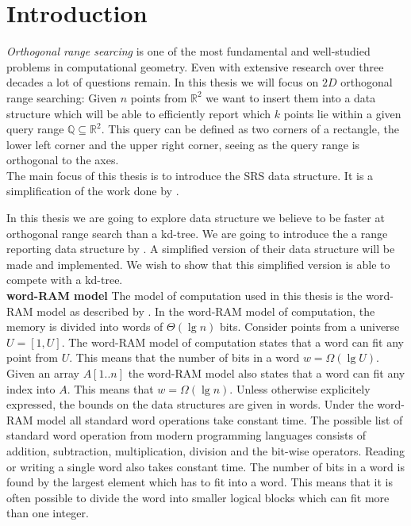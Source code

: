 \chapter{Introduction}
\label{ch:intro}

\emph{Orthogonal range searcing} is one of the most fundamental and well-studied problems in computational geometry. Even with extensive research over three decades a lot of questions remain. In this thesis we will focus on $2D$ orthogonal range searching: Given $n$ points from $\mathbb{R}^2$ we want to insert them into a data structure which will be able to efficiently report which $k$ points lie within a given query range $\mathbb{Q} \subseteq \mathbb{R}^2$. This query can be defined as two corners of a rectangle, the lower left corner and the upper right corner, seeing as the query range is orthogonal to the axes. \\

The main focus of this thesis is to introduce the SRS  data structure. It is a simplification of the work done by \citet{chanetal}.

In this thesis we are going to explore data structure we believe to be faster at orthogonal range search than a kd-tree. We are going to introduce the a range reporting data structure by \citet{chanetal}. A simplified version of their data structure will be made and implemented. We wish to show that this simplified version is able to compete with a kd-tree. \\



\noindent \textbf{word-RAM model} The model of computation used in this thesis is the word-RAM model as described by . In the word-RAM model of computation, the memory is divided into words of $\Theta(\lg n)$ bits. Consider points from a universe $U = [1,U]$. The word-RAM model of computation states that a word can fit any point from $U$. This means that the number of bits in a word $w = \Omega(\lg U)$. Given an array $A[1..n]$ the word-RAM model also states that a word can fit any index into $A$. This means that $w = \Omega(\lg n)$. Unless otherwise explicitely expressed, the bounds on the data structures are given in words. Under the word-RAM model all standard word operations take constant time. The possible list of standard word operation from modern programming languages consists of addition, subtraction, multiplication, division and the bit-wise operators. Reading or writing a single word also takes constant time. The number of bits in a word is found by the largest element which has to fit into a word. This means that it is often possible to divide the word into smaller logical blocks which can fit more than one integer.  \\


